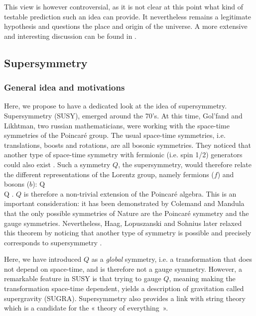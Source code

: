         This view is however controversial, as it is not clear at this point what kind of
        testable prediction such an idea can provide. It nevertheless remains a legitimate
        hypothesis and questions the place and origin of the universe. A more extensive
        and interesting discussion can be found in \cite{MultiversBarrau}.

        \subsection{Supersymmetry \label{sec:SUSY}}

        \subsubsection{General idea and motivations}

        Here, we propose to have a dedicated look at the idea of supersymmetry. Supersymmetry
        (SUSY), emerged around the 70's. At this time, Gol'fand and Likhtman, two
        russian mathematicians, were working with the space-time symmetries of the Poincaré
        group. The usual space-time symmetries, i.e. translations, boosts and rotations,
        are all bosonic symmetries. They noticed that another type of space-time symmetry
        with fermionic (i.e. spin 1/2) generators could also exist \cite{FirstSUSYPaper}.
        Such a symmetry $Q$,
        the supersymmetry, would therefore relate the different representations of the
        Lorentz group, namely fermions ($f$) and bosons ($b$):
        {
            Q \rvert {} \rangle \rightarrow \rvert {} \rangle \nonumber
            \\
            Q \rvert {} \rangle \rightarrow \rvert {} \rangle.
        }
        $Q$ is therefore a non-trivial extension of the
        Poincaré algebra. This is an important consideration: it has been demonstrated by
        Colemand and Mandula \cite{ColemandMandula} that the only possible symmetries of Nature are the
        Poincaré symmetry and the gauge symmetries. Nevertheless, Haag, Lopuszanski and
        Sohnius later relaxed this theorem \cite{HaagLopuszanskiSohnius} by noticing that another type of symmetry is
        possible and precisely corresponds to supersymmetry \cite{SUSYPrimer, Dawson}.

        Here, we have introduced $Q$ as a \emph{global} symmetry, i.e. a transformation
        that does not depend on space-time, and is therefore not a gauge symmetry.
        However, a remarkable feature in SUSY is that trying to gauge $Q$, meaning making
        the transformation space-time dependent, yields a description of gravitation called
        supergravity (SUGRA). Supersymmetry also provides a link with string theory which
        is a candidate for the « theory of everything\, ».

